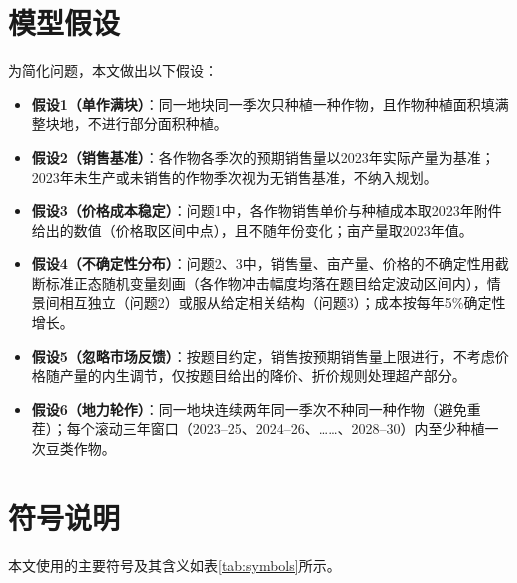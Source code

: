 \section{模型假设}
为简化问题，本文做出以下假设：
\begin{itemize}
	\item \textbf{假设1（单作满块）}：同一地块同一季次只种植一种作物，且作物种植面积填满整块地，不进行部分面积种植。
	\item \textbf{假设2（销售基准）}：各作物各季次的预期销售量以2023年实际产量为基准；2023年未生产或未销售的作物季次视为无销售基准，不纳入规划。
	\item \textbf{假设3（价格成本稳定）}：问题1中，各作物销售单价与种植成本取2023年附件给出的数值（价格取区间中点），且不随年份变化；亩产量取2023年值。
	\item \textbf{假设4（不确定性分布）}：问题2、3中，销售量、亩产量、价格的不确定性用截断标准正态随机变量刻画（各作物冲击幅度均落在题目给定波动区间内），情景间相互独立（问题2）或服从给定相关结构（问题3）；成本按每年5\%确定性增长。
	\item \textbf{假设5（忽略市场反馈）}：按题目约定，销售按预期销售量上限进行，不考虑价格随产量的内生调节，仅按题目给出的降价、折价规则处理超产部分。
	\item \textbf{假设6（地力轮作）}：同一地块连续两年同一季次不种同一种作物（避免重茬）；每个滚动三年窗口（2023--25、2024--26、……、2028--30）内至少种植一次豆类作物。
\end{itemize}

\section{符号说明}
本文使用的主要符号及其含义如表\ref{tab:symbols}所示。

